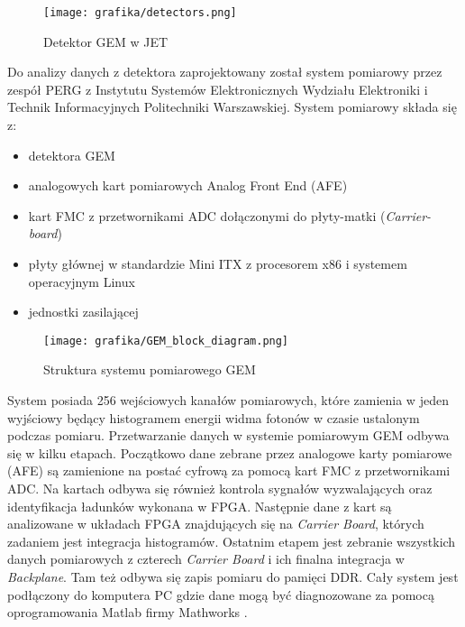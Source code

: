 	\begin{figure}[!here]
	\begin{center}
	\texttt{[image: grafika/detectors.png]}
	\end{center}
	\caption{Detektor GEM w JET}
	\label{GEM_PHOTO}
	\end{figure}

Do analizy danych z detektora zaprojektowany został system pomiarowy przez zespół PERG z Instytutu Systemów Elektronicznych Wydziału Elektroniki i Technik Informacyjnych Politechniki Warszawskiej. System pomiarowy składa się z:
\begin{itemize}
\item detektora GEM
\item  analogowych kart pomiarowych Analog Front End (AFE)
\item kart FMC z przetwornikami ADC dołączonymi do płyty-matki  (\textit{Carrier-board})
\item płyty głównej w standardzie Mini ITX z procesorem x86 i systemem operacyjnym Linux 
\item jednostki zasilającej
\end{itemize}

	\begin{figure}[!ht]
	\begin{center}
	\texttt{[image: grafika/GEM\_block\_diagram.png]}
	\end{center}
	\caption{Struktura systemu pomiarowego GEM}
	\label{GEMSTRUCTURE}
	\end{figure}


	
System posiada 256 wejściowych kanałów pomiarowych, które zamienia w jeden wyjściowy będący histogramem energii widma fotonów w czasie ustalonym podczas pomiaru. Przetwarzanie danych w systemie pomiarowym GEM odbywa się w kilku etapach. Początkowo dane zebrane przez analogowe karty pomiarowe (AFE) są zamienione na postać cyfrową za pomocą kart FMC z przetwornikami ADC. Na kartach odbywa się również kontrola sygnałów wyzwalających oraz identyfikacja ładunków wykonana w FPGA. Następnie dane z kart są analizowane w układach FPGA znajdujących się na \textit{Carrier Board}, których zadaniem jest integracja histogramów. Ostatnim etapem jest zebranie wszystkich danych pomiarowych z czterech \textit{Carrier Board} i ich finalna integracja w \textit{Backplane}. Tam też odbywa się zapis pomiaru do pamięci DDR. Cały system jest podłączony do komputera PC gdzie dane mogą być diagnozowane za pomocą oprogramowania Matlab firmy Mathworks \cite{MATLAB}.  

